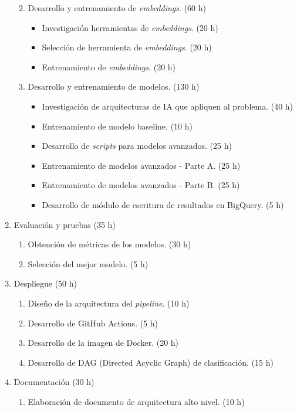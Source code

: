 \documentclass[
11pt, %
]{charter}
\begin{document}
\begin{enumerate}
\begin{enumerate}
\begin{itemize}
				\end{itemize}
			\item Desarrollo y entrenamiento de \textit{embeddings}. (60 h)
				\begin{itemize}
					\item Investigación herramientas de \textit{embeddings}. (20 h)
					\item Selección de herramienta de \textit{embeddings}. (20 h)
					\item Entrenamiento de \textit{embeddings}. (20 h)
				\end{itemize}
			\item Desarrollo y entrenamiento de modelos. (130 h)
				\begin{itemize}
					\item Investigación de arquitecturas de IA que apliquen al problema. (40 h)
					\item Entrenamiento de modelo baseline. (10 h)
					\item Desarrollo de \textit{scripts} para modelos avanzados. (25 h)
					\item Entrenamiento de modelos avanzados - Parte A. (25 h)
					\item Entrenamiento de modelos avanzados - Parte B. (25 h)
					\item Desarrollo de módulo de escritura de resultados en BigQuery. (5 h)
				\end{itemize}
		\end{enumerate}
	\item Evaluación y pruebas (35 h)
		\begin{enumerate}
			\item Obtención de métricas de los modelos. (30 h)
			\item Selección del mejor modelo. (5 h)
		\end{enumerate}
	\item Despliegue (50 h)
		\begin{enumerate}
			\item Diseño de la arquitectura del \textit{pipeline}. (10 h)
			\item Desarrollo de GitHub Actions. (5 h)
			\item Desarrollo de la imagen de Docker. (20 h)
			\item Desarrollo de DAG (Directed Acyclic Graph) de clasificación. (15 h)
		\end{enumerate}
	\item Documentación (30 h)
		\begin{enumerate}
			\item Elaboración de documento de arquitectura alto nivel. (10 h)

\end{enumerate}
\end{enumerate}
\end{document}
